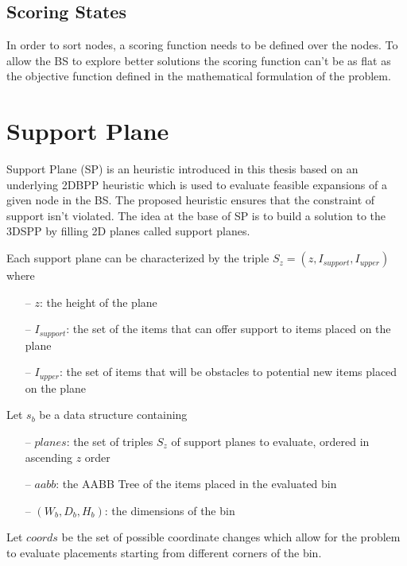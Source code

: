 

\subsection{Scoring States}\label{chapter:heuristics:beamsearch:scoring}
In order to sort nodes, a scoring function needs to be defined over the nodes. 
To allow the BS to explore better solutions the scoring function can't be as flat as the objective function defined in the mathematical formulation of the problem. %

\section{Support Plane}\label{chapter:heuristics:supportplane}
Support Plane (SP) is an heuristic introduced in this thesis based on an underlying 2DBPP heuristic which is used to evaluate feasible expansions of a given node in the BS.
The proposed heuristic ensures that the constraint of support isn't violated.
The idea at the base of SP is to build a solution to the 3DSPP by filling 2D planes called support planes.

Each support plane can be characterized by the triple $S_z = (z, I_{support}, I_{upper})$ where
\begin{itemize}
    \item[--] $z$: the height of the plane 
    \item[--] $I_{support}$: the set of the items that can offer support to items placed on the plane
    \item[--] $I_{upper}$: the set of items that will be obstacles to potential new items placed on the plane %
\end{itemize}%

Let $s_b$ be a data structure containing
\begin{itemize}
    \item[--] $planes$: the set of triples $S_z$ of support planes to evaluate, ordered in ascending $z$ order
    \item[--] $aabb$: the AABB Tree of the items placed in the evaluated bin
    \item[--] $(W_{b}, D_{b}, H_{b})$: the dimensions of the bin
\end{itemize}

Let $coords$ be the set of possible coordinate changes which allow for the problem to evaluate placements starting from different corners of the bin. %

